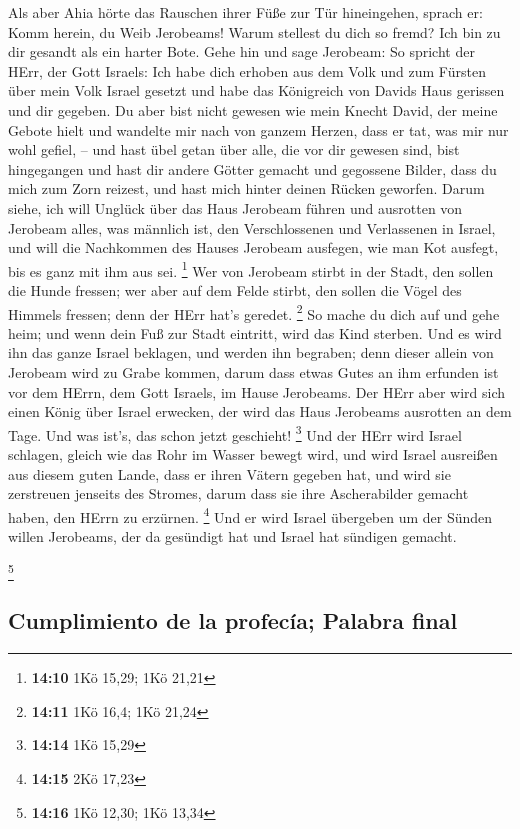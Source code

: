  Als aber Ahia hörte das Rauschen ihrer Füße zur Tür
hineingehen, sprach er: Komm herein, du Weib Jerobeams! Warum stellest
du dich so fremd? Ich bin zu dir gesandt als ein harter Bote.
 Gehe hin und sage Jerobeam: So spricht der HErr, der Gott
Israels: Ich habe dich erhoben aus dem Volk und zum Fürsten über mein
Volk Israel gesetzt  und habe das Königreich von Davids
Haus gerissen und dir gegeben. Du aber bist nicht gewesen wie mein
Knecht David, der meine Gebote hielt und wandelte mir nach von ganzem
Herzen, dass er tat, was mir nur wohl gefiel, --  und hast
übel getan über alle, die vor dir gewesen sind, bist hingegangen und
hast dir andere Götter gemacht und gegossene Bilder, dass du mich zum
Zorn reizest, und hast mich hinter deinen Rücken geworfen.
 Darum siehe, ich will Unglück über das Haus Jerobeam
führen und ausrotten von Jerobeam alles, was männlich ist, den
Verschlossenen und Verlassenen in Israel, und will die Nachkommen des
Hauses Jerobeam ausfegen, wie man Kot ausfegt, bis es ganz mit ihm aus
sei. \footnote{\textbf{14:10} 1Kö 15,29; 1Kö 21,21}  Wer
von Jerobeam stirbt in der Stadt, den sollen die Hunde fressen; wer aber
auf dem Felde stirbt, den sollen die Vögel des Himmels fressen; denn der
HErr hat's geredet. \footnote{\textbf{14:11} 1Kö 16,4; 1Kö 21,24}
 So mache du dich auf und gehe heim; und wenn dein Fuß
zur Stadt eintritt, wird das Kind sterben.  Und es wird
ihn das ganze Israel beklagen, und werden ihn begraben; denn dieser
allein von Jerobeam wird zu Grabe kommen, darum dass etwas Gutes an ihm
erfunden ist vor dem HErrn, dem Gott Israels, im Hause Jerobeams.
 Der HErr aber wird sich einen König über Israel
erwecken, der wird das Haus Jerobeams ausrotten an dem Tage. Und was
ist's, das schon jetzt geschieht! \footnote{\textbf{14:14} 1Kö 15,29}
 Und der HErr wird Israel schlagen, gleich wie das Rohr
im Wasser bewegt wird, und wird Israel ausreißen aus diesem guten Lande,
dass er ihren Vätern gegeben hat, und wird sie zerstreuen jenseits des
Stromes, darum dass sie ihre Ascherabilder gemacht haben, den HErrn zu
erzürnen. \footnote{\textbf{14:15} 2Kö 17,23}  Und er
wird Israel übergeben um der Sünden willen Jerobeams, der da gesündigt
hat und Israel hat sündigen gemacht.

\footnote{\textbf{14:16} 1Kö 12,30; 1Kö 13,34}

\hypertarget{cumplimiento-de-la-profecuxeda-palabra-final}{%
\subsection{Cumplimiento de la profecía; Palabra
final}\label{cumplimiento-de-la-profecuxeda-palabra-final}}

